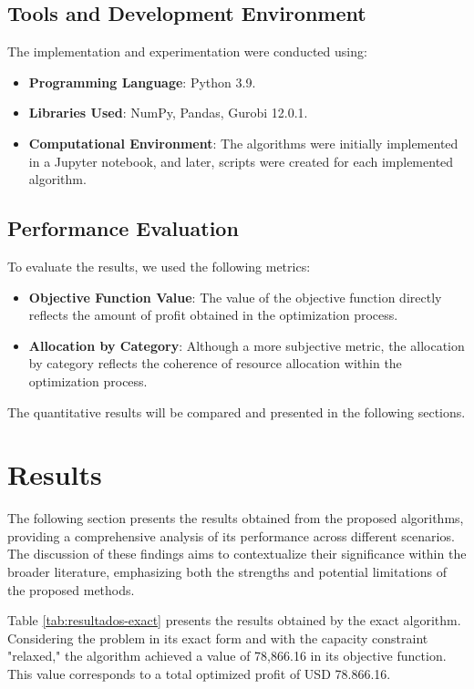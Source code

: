 \documentclass[]{article}
\begin{document}
\subsection{Tools and Development Environment}
The implementation and experimentation were conducted using:
\begin{itemize}
	\item \textbf{Programming Language}: Python 3.9.
	\item \textbf{Libraries Used}: NumPy, Pandas, Gurobi 12.0.1.
	\item \textbf{Computational Environment}: The algorithms were initially implemented in a Jupyter notebook, and later, scripts were created for each implemented algorithm.
\end{itemize}

\subsection{Performance Evaluation}
To evaluate the results, we used the following metrics:
\begin{itemize}
	\item \textbf{Objective Function Value}: The value of the objective function directly reflects the amount of profit obtained in the optimization process.
	\item \textbf{Allocation by Category}: Although a more subjective metric, the allocation by category reflects the coherence of resource allocation within the optimization process.
\end{itemize}

The quantitative results will be compared and presented in the following sections.



\section{Results}

The following section presents the results obtained from the proposed algorithms, providing a comprehensive analysis of its performance across different scenarios. The discussion of these findings aims to contextualize their significance within the broader literature, emphasizing both the strengths and potential limitations of the proposed methods.

Table \ref{tab:resultados-exact} presents the results obtained by the exact algorithm. Considering the problem in its exact form and with the capacity constraint "relaxed," the algorithm achieved a value of 78,866.16 in its objective function. This value corresponds to a total optimized profit of USD 78.866.16.
\end{document}
